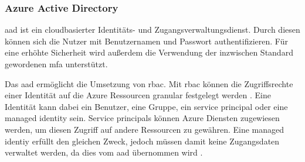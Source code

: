 \subsubsection{Azure Active Directory} \label{subsec:grundlagen:azure:sicherheitUndDatenschutz:aad}
\ac{aad} ist ein cloudbasierter Identitäts- und Zugangsverwaltungsdienst. Durch diesen können sich die Nutzer mit Benutzernamen und Passwort authentifizieren. Für eine erhöhte Sicherheit wird außerdem die Verwendung der inzwischen Standard gewordenen \ac{mfa} unterstützt.

Das \ac{aad} ermöglicht die Umsetzung von \ac{rbac}. Mit \ac{rbac} können die Zugriffsrechte einer Identität auf die Azure Ressourcen granular festgelegt werden \cite{stefanovic_azure_2021}. Eine Identität kann dabei ein Benutzer, eine Gruppe, ein service principal oder eine managed identity sein. Service principals können Azure Diensten zugewiesen werden, um diesen Zugriff auf andere Ressourcen zu gewähren. Eine managed identiy erfüllt den gleichen Zweck, jedoch müssen damit keine Zugangsdaten verwaltet werden, da dies vom \ac{aad} übernommen wird \cite{copeland_security_2021}.

